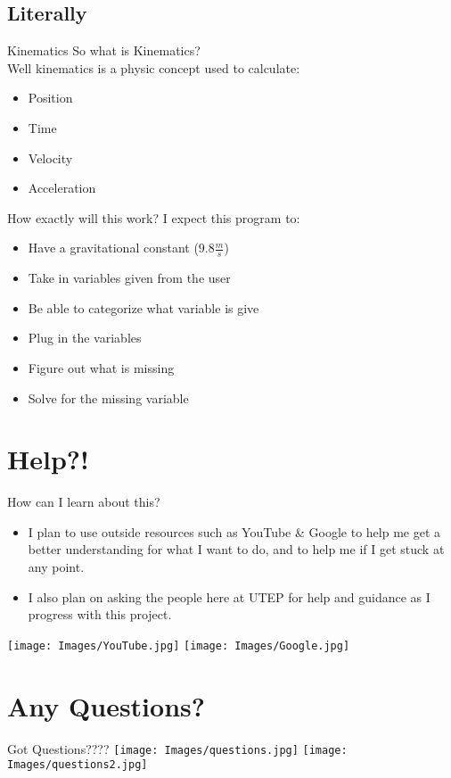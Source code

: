 \documentclass{beamer}
\begin{document}
		\subsection{Literally}
			\begin{frame}{Kinematics}
				So what is Kinematics? \\
				Well kinematics is a physic concept used to calculate:
					\begin{itemize}
						\item Position
						\item Time
						\item Velocity
						\item Acceleration
					\end{itemize}
	
			\end{frame}
			\begin{frame}{How exactly will this work?}
				I expect this program to:
					\begin{itemize}
						\item Have a gravitational constant ($9.8\frac{m}{s}$)
						\item Take in variables given from the user
						\item Be able to categorize what variable is give
						\item Plug in the variables
						\item Figure out what is missing
						\item Solve for the missing variable
					\end{itemize}
				
			\end{frame}
	\transdissolve
		
	\section{Help?!}
			\begin{frame}{How can I learn about this?}
				\begin{itemize}
					\item I plan to use outside resources such as YouTube \& Google to help me get a better understanding for what I want to do, and to help me if I get stuck at any point. \\
					\item I also plan on asking the people here at UTEP for help and guidance as I progress with this project.\\
				\end{itemize}
				\texttt{[image: Images/YouTube.jpg]}
				\hspace{1.0 in}
				\texttt{[image: Images/Google.jpg]}
			\end{frame}
	\transsplithorizontalin
		
	\section{Any Questions?}
		\begin{frame}{Got Questions????}
			\texttt{[image: Images/questions.jpg]}
			\texttt{[image: Images/questions2.jpg]}
		\end{frame}
\end{document}
